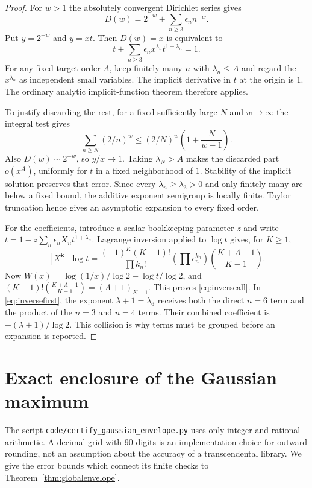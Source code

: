 \begin{proof}
For $w>1$ the absolutely convergent Dirichlet series gives
\[
 D(w)=2^{-w}+\sum_{n\ge3}\epsilon_n n^{-w}.
\]
Put $y=2^{-w}$ and $y=xt$. Then $D(w)=x$ is equivalent to
\begin{equation}\label{eq:timplicit}
 t+\sum_{n\ge3}\epsilon_n x^{\lambda_n}t^{1+\lambda_n}=1.
\end{equation}
For any fixed target order $A$, keep finitely many $n$ with
$\lambda_n\le A$ and regard the $x^{\lambda_n}$ as independent small
variables. The implicit derivative in $t$ at the origin is $1$.
The ordinary analytic implicit-function theorem therefore applies.

To justify discarding the rest, for a fixed sufficiently large $N$ and
$w\to\infty$ the integral test gives
\[
 \sum_{n\ge N}(2/n)^w
 \le(2/N)^w\left(1+\frac{N}{w-1}\right).
\]
Also $D(w)\sim2^{-w}$, so $y/x\to1$. Taking $\lambda_N>A$ makes
the discarded part $o(x^A)$, uniformly for $t$ in a fixed neighborhood
of $1$. Stability of the implicit solution preserves that error.
Since every $\lambda_n\ge\lambda_3>0$ and only finitely many are
below a fixed bound, the additive exponent semigroup is locally finite.
Taylor truncation hence gives an asymptotic expansion to every fixed order.

For the coefficients, introduce a scalar bookkeeping parameter $z$ and
write $t=1-z\sum_n\epsilon_n X_nt^{1+\lambda_n}$. Lagrange inversion
applied to $\log t$ gives, for $K\ge1$,
\[
 [X^{\mathbf k}]\log t
 =\frac{(-1)^K(K-1)!}{\prod k_n!}
   \left(\prod\epsilon_n^{k_n}\right)
   \binom{K+\Lambda-1}{K-1}.
\]
Now $W(x)=\log(1/x)/\log2-\log t/\log2$, and
$(K-1)!\binom{K+\Lambda-1}{K-1}=(\Lambda+1)_{K-1}$.
This proves \eqref{eq:inverseall}. In \eqref{eq:inversefirst}, the
exponent $\lambda+1=\lambda_6$ receives both the direct $n=6$ term
and the product of the $n=3$ and $n=4$ terms. Their combined coefficient
is $-(\lambda+1)/\log2$. This collision is why terms must be grouped
before an expansion is reported.
\end{proof}

\section{Exact enclosure of the Gaussian maximum}
\label{sec:gausscertificate}

The script \texttt{code/certify\_gaussian\_envelope.py} uses only
integer and rational arithmetic. A decimal grid with 90 digits is an
implementation choice for outward rounding, not an assumption about
the accuracy of a transcendental library. We give the error bounds
which connect its finite checks to Theorem~\ref{thm:globalenvelope}.

